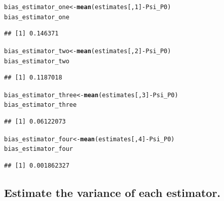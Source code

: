\documentclass{article}\usepackage[]{graphicx}\usepackage[]{xcolor}
\makeatletter
\newcommand{\hlnum}[1]{\textcolor[rgb]{0.686,0.059,0.569}{#1}}%
\newcommand{\hlopt}[1]{\textcolor[rgb]{0,0,0}{#1}}%
\newcommand{\hlstd}[1]{\textcolor[rgb]{0.345,0.345,0.345}{#1}}%
\newcommand{\hlkwb}[1]{\textcolor[rgb]{0.69,0.353,0.396}{#1}}%
\newcommand{\hlkwd}[1]{\textcolor[rgb]{0.737,0.353,0.396}{\textbf{#1}}}%
\newenvironment{kframe}{%
 \def\at@end@of@kframe{}%
 \ifinner\ifhmode%
  \def\at@end@of@kframe{\end{minipage}}%
  \begin{minipage}{\columnwidth}%
 \fi\fi%
 \def\FrameCommand##1{\hskip\@totalleftmargin \hskip-\fboxsep
 \colorbox{shadecolor}{##1}\hskip-\fboxsep
     \hskip-\linewidth \hskip-\@totalleftmargin \hskip\columnwidth}%
 \MakeFramed {\advance\hsize-\width
   \@totalleftmargin\z@ \linewidth\hsize
   \@setminipage}}%
 {\par\unskip\endMakeFramed%
 \at@end@of@kframe}
\newenvironment{knitrout}{}{} %
\makeatother
\begin{document}
\begin{knitrout}
\color{fgcolor}\begin{kframe}
\begin{alltt}
\hlstd{bias_estimator_one} \hlkwb{<-} \hlkwd{mean}\hlstd{(estimates[,}\hlnum{1}\hlstd{]} \hlopt{-} \hlstd{Psi_P0)}
\hlstd{bias_estimator_one}
\end{alltt}
\begin{verbatim}
## [1] 0.146371
\end{verbatim}
\begin{alltt}
\hlstd{bias_estimator_two} \hlkwb{<-} \hlkwd{mean}\hlstd{(estimates[,}\hlnum{2}\hlstd{]} \hlopt{-} \hlstd{Psi_P0)}
\hlstd{bias_estimator_two}
\end{alltt}
\begin{verbatim}
## [1] 0.1187018
\end{verbatim}
\begin{alltt}
\hlstd{bias_estimator_three} \hlkwb{<-} \hlkwd{mean}\hlstd{(estimates[,}\hlnum{3}\hlstd{]} \hlopt{-} \hlstd{Psi_P0)}
\hlstd{bias_estimator_three}
\end{alltt}
\begin{verbatim}
## [1] 0.06122073
\end{verbatim}
\begin{alltt}
\hlstd{bias_estimator_four} \hlkwb{<-} \hlkwd{mean}\hlstd{(estimates[,}\hlnum{4}\hlstd{]} \hlopt{-} \hlstd{Psi_P0)}
\hlstd{bias_estimator_four}
\end{alltt}
\begin{verbatim}
## [1] 0.001862327
\end{verbatim}
\end{kframe}
\end{knitrout}
  
  \subsection{Estimate the variance of each estimator.}
  
\end{document}
